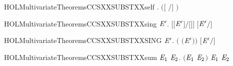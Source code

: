 \begin{SaveVerbatim}{HOLMultivariateTheoremsCCSXXSUBSTXXself}
\HOLTokenTurnstile{} \HOLSymConst{\HOLTokenForall{}} .   \HOLSymConst{\HOLTokenImp{}} \ensuremath{(}\ensuremath{[}  \ensuremath{/}\ensuremath{]}  \HOLSymConst{\ensuremath{=}} \ensuremath{)}
\end{SaveVerbatim}
\newcommand{\HOLMultivariateTheoremsCCSXXSUBSTXXself}{\UseVerbatim{HOLMultivariateTheoremsCCSXXSUBSTXXself}}
\begin{SaveVerbatim}{HOLMultivariateTheoremsCCSXXSUBSTXXsing}
\HOLTokenTurnstile{} \HOLSymConst{\HOLTokenForall{}}  \ensuremath{\HOLBoundVar{E}\sp{\prime}}. \ensuremath{[}\ensuremath{[}\ensuremath{\HOLBoundVar{E}\sp{\prime}}\ensuremath{]}\ensuremath{/}\ensuremath{[}\ensuremath{]}\ensuremath{]}  \HOLSymConst{\ensuremath{=}} \ensuremath{[}\ensuremath{\HOLBoundVar{E}\sp{\prime}}\ensuremath{/}\ensuremath{]} 
\end{SaveVerbatim}
\newcommand{\HOLMultivariateTheoremsCCSXXSUBSTXXsing}{\UseVerbatim{HOLMultivariateTheoremsCCSXXSUBSTXXsing}}
\begin{SaveVerbatim}{HOLMultivariateTheoremsCCSXXSUBSTXXSING}
\HOLTokenTurnstile{} \HOLSymConst{\HOLTokenForall{}}  \ensuremath{\HOLBoundVar{E}\sp{\prime}}.  \ensuremath{(} \HOLSymConst{|+} \ensuremath{(}\HOLSymConst{,}\ensuremath{\HOLBoundVar{E}\sp{\prime}}\ensuremath{)}\ensuremath{)}  \HOLSymConst{\ensuremath{=}} \ensuremath{[}\ensuremath{\HOLBoundVar{E}\sp{\prime}}\ensuremath{/}\ensuremath{]} 
\end{SaveVerbatim}
\newcommand{\HOLMultivariateTheoremsCCSXXSUBSTXXSING}{\UseVerbatim{HOLMultivariateTheoremsCCSXXSUBSTXXSING}}
\begin{SaveVerbatim}{HOLMultivariateTheoremsCCSXXSUBSTXXsum}
\HOLTokenTurnstile{} \HOLSymConst{\HOLTokenForall{}} \ensuremath{\HOLBoundVar{E}\sb{\mathrm{1}}} \ensuremath{\HOLBoundVar{E}\sb{\mathrm{2}}}.
         \ensuremath{(}\ensuremath{\HOLBoundVar{E}\sb{\mathrm{1}}} \HOLSymConst{\ensuremath{+}} \ensuremath{\HOLBoundVar{E}\sb{\mathrm{2}}}\ensuremath{)} \HOLSymConst{\ensuremath{=}}
         \ensuremath{\HOLBoundVar{E}\sb{\mathrm{1}}} \HOLSymConst{\ensuremath{+}}   \ensuremath{\HOLBoundVar{E}\sb{\mathrm{2}}}
\end{SaveVerbatim}
